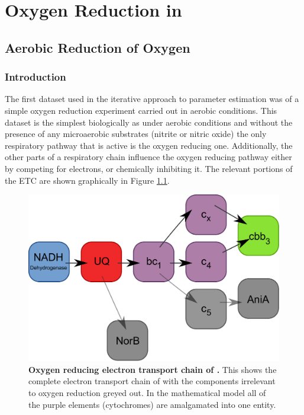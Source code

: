 \chapter{Oxygen Reduction in \Nm{}}
\label{chap:oxygenreduction}
\section{Aerobic Reduction of Oxygen}
\subsection{Introduction}
The first dataset used in the iterative approach to parameter estimation was of a simple oxygen reduction experiment carried out in aerobic conditions. This dataset is the simplest biologically as under aerobic conditions and without the presence of any microaerobic substrates (nitrite or nitric oxide) the only respiratory pathway that is active is the oxygen reducing one. Additionally, the other parts of a respiratory chain influence the oxygen reducing pathway either by competing for electrons, or chemically inhibiting it. The relevant portions of the ETC are shown graphically in Figure \ref{fig:o2_resp_chain}.

\begin{figure}[tbp]
	\centering
	\includegraphics[width=14cm]{05-oxygenreduction/data/o2_resp_chain.pdf}
	\caption[Oxygen reducing electron transport chain of \Nm{}]{{\bf Oxygen reducing electron transport chain of \Nm{}.} This shows the complete electron transport chain of \Nsm{} with the components irrelevant to oxygen reduction greyed out. In the mathematical model all of the purple elements (cytochromes) are amalgamated into one entity.
	\label{fig:o2_resp_chain}}
\end{figure}

